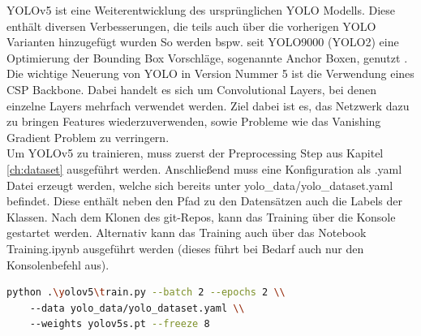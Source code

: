 YOLOv5 ist eine Weiterentwicklung des ursprünglichen YOLO Modells.
Diese enthält diversen Verbesserungen, die teils auch über die vorherigen YOLO Varianten hinzugefügt wurden
So werden bspw. seit YOLO9000 (YOLO2) eine Optimierung der Bounding Box Vorschläge, sogenannte Anchor Boxen, genutzt \cite{yolo2}.
Die wichtige Neuerung von YOLO in Version Nummer 5 ist die Verwendung eines CSP Backbone.
Dabei handelt es sich um Convolutional Layers, bei denen einzelne Layers mehrfach verwendet werden.
Ziel dabei ist es, das Netzwerk dazu zu bringen Features wiederzuverwenden, sowie Probleme wie das Vanishing Gradient Problem zu verringern.\\

Um YOLOv5 zu trainieren, muss zuerst der Preprocessing Step aus Kapitel \ref{ch:dataset} ausgeführt werden.
Anschließend muss eine Konfiguration als .yaml Datei erzeugt werden, welche sich bereits unter yolo\_data/yolo\_dataset.yaml befindet.
Diese enthält neben den Pfad zu den Datensätzen auch die Labels der Klassen.
Nach dem Klonen des git-Repos, kann das Training über die Konsole gestartet werden.
Alternativ kann das Training auch über das Notebook Training.ipynb ausgeführt werden (dieses führt bei Bedarf auch nur den Konsolenbefehl aus).

\begin{lstlisting}[language=bash,caption={YOLO Training},label={lst:yolo_train},captionpos=b,showstringspaces=false, basicstyle=\small]
python .\yolov5\train.py --batch 2 --epochs 2 \\
    --data yolo_data/yolo_dataset.yaml \\
    --weights yolov5s.pt --freeze 8
\end{lstlisting}

